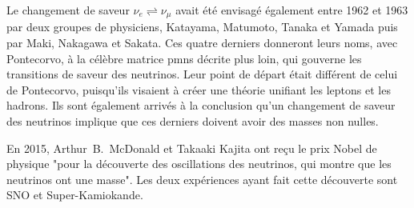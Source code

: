             Le changement de saveur $\nu_e\rightleftharpoons\nu_{\mu}$ avait été envisagé également entre 1962 et 1963 par deux groupes de physiciens, Katayama, Matumoto, Tanaka et Yamada\cite{Nakagawa1963} puis par Maki,  Nakagawa et  Sakata\cite{Maki1962}. Ces quatre derniers donneront leurs noms, avec Pontecorvo, à la célèbre matrice \gls{pmns} décrite plus loin, qui gouverne les transitions de saveur des neutrinos. Leur point de départ était différent de celui de Pontecorvo, puisqu'ils visaient à créer une théorie unifiant les leptons et les hadrons. Ils sont également arrivés à la conclusion qu'un changement de saveur des neutrinos implique que ces derniers doivent avoir des masses non nulles.
            
            En 2015, Arthur~B.~McDonald et Takaaki Kajita ont reçu le prix Nobel de physique "pour la découverte des oscillations des neutrinos, qui montre que les neutrinos ont une masse". Les deux expériences ayant fait cette découverte sont SNO\cite{Aharmim2013} et Super-Kamiokande\cite{Fukuda1998}.
            
